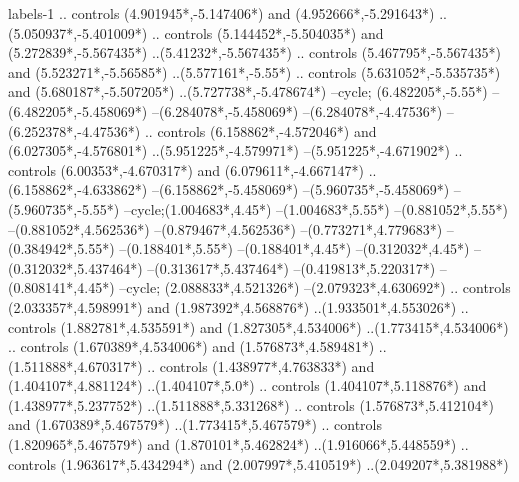 {\begin{scope}[x=1mm,y=1mm,line width=\SCstroke mm,line cap=round,line join=round]
\begin{SCpart}{labels-1}
.. controls ({4.901945*\SCF},{-5.147406*\SCF}) and ({4.952666*\SCF},{-5.291643*\SCF}) ..({5.050937*\SCF},{-5.401009*\SCF})
.. controls ({5.144452*\SCF},{-5.504035*\SCF}) and ({5.272839*\SCF},{-5.567435*\SCF}) ..({5.41232*\SCF},{-5.567435*\SCF})
.. controls ({5.467795*\SCF},{-5.567435*\SCF}) and ({5.523271*\SCF},{-5.56585*\SCF}) ..({5.577161*\SCF},{-5.55*\SCF})
.. controls ({5.631052*\SCF},{-5.535735*\SCF}) and ({5.680187*\SCF},{-5.507205*\SCF}) ..({5.727738*\SCF},{-5.478674*\SCF})
--cycle;
 ({6.482205*\SCF},{-5.55*\SCF})
--({6.482205*\SCF},{-5.458069*\SCF})
--({6.284078*\SCF},{-5.458069*\SCF})
--({6.284078*\SCF},{-4.47536*\SCF})
--({6.252378*\SCF},{-4.47536*\SCF})
.. controls ({6.158862*\SCF},{-4.572046*\SCF}) and ({6.027305*\SCF},{-4.576801*\SCF}) ..({5.951225*\SCF},{-4.579971*\SCF})
--({5.951225*\SCF},{-4.671902*\SCF})
.. controls ({6.00353*\SCF},{-4.670317*\SCF}) and ({6.079611*\SCF},{-4.667147*\SCF}) ..({6.158862*\SCF},{-4.633862*\SCF})
--({6.158862*\SCF},{-5.458069*\SCF})
--({5.960735*\SCF},{-5.458069*\SCF})
--({5.960735*\SCF},{-5.55*\SCF})
--cycle; ({1.004683*\SCF},{4.45*\SCF})
--({1.004683*\SCF},{5.55*\SCF})
--({0.881052*\SCF},{5.55*\SCF})
--({0.881052*\SCF},{4.562536*\SCF})
--({0.879467*\SCF},{4.562536*\SCF})
--({0.773271*\SCF},{4.779683*\SCF})
--({0.384942*\SCF},{5.55*\SCF})
--({0.188401*\SCF},{5.55*\SCF})
--({0.188401*\SCF},{4.45*\SCF})
--({0.312032*\SCF},{4.45*\SCF})
--({0.312032*\SCF},{5.437464*\SCF})
--({0.313617*\SCF},{5.437464*\SCF})
--({0.419813*\SCF},{5.220317*\SCF})
--({0.808141*\SCF},{4.45*\SCF})
--cycle;
 ({2.088833*\SCF},{4.521326*\SCF})
--({2.079323*\SCF},{4.630692*\SCF})
.. controls ({2.033357*\SCF},{4.598991*\SCF}) and ({1.987392*\SCF},{4.568876*\SCF}) ..({1.933501*\SCF},{4.553026*\SCF})
.. controls ({1.882781*\SCF},{4.535591*\SCF}) and ({1.827305*\SCF},{4.534006*\SCF}) ..({1.773415*\SCF},{4.534006*\SCF})
.. controls ({1.670389*\SCF},{4.534006*\SCF}) and ({1.576873*\SCF},{4.589481*\SCF}) ..({1.511888*\SCF},{4.670317*\SCF})
.. controls ({1.438977*\SCF},{4.763833*\SCF}) and ({1.404107*\SCF},{4.881124*\SCF}) ..({1.404107*\SCF},{5.0*\SCF})
.. controls ({1.404107*\SCF},{5.118876*\SCF}) and ({1.438977*\SCF},{5.237752*\SCF}) ..({1.511888*\SCF},{5.331268*\SCF})
.. controls ({1.576873*\SCF},{5.412104*\SCF}) and ({1.670389*\SCF},{5.467579*\SCF}) ..({1.773415*\SCF},{5.467579*\SCF})
.. controls ({1.820965*\SCF},{5.467579*\SCF}) and ({1.870101*\SCF},{5.462824*\SCF}) ..({1.916066*\SCF},{5.448559*\SCF})
.. controls ({1.963617*\SCF},{5.434294*\SCF}) and ({2.007997*\SCF},{5.410519*\SCF}) ..({2.049207*\SCF},{5.381988*\SCF})

\end{SCpart}
\end{scope}}
